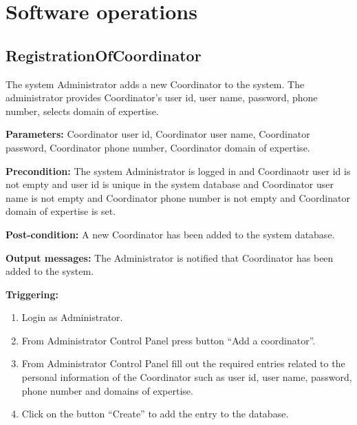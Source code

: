 \chapter{Software operations}
\label{chap:soptware_operations}

\section{RegistrationOfCoordinator}
\label{operation:RegistrationOfCoordinator}
The system Administrator adds a new Coordinator to the system. The administrator 
provides Coordinator's user id, user name, password, phone number, selects
domain of expertise.

\begin{description}

\item \textbf{Parameters:} Coordinator user id, Coordinator user name,
Coordinator password, Coordinator phone number, Coordinator domain of expertise.
\item \textbf{Precondition:} The system Administrator is logged in and
Coordinaotr user id is not empty and user id is unique in the system database
and Coordinator user name is not empty and Coordinator phone number is not empty and Coordinator domain of expertise is
set.
\item \textbf{Post-condition:} A new Coordinator has been added to the system
database.
\item \textbf{Output messages:} The Administrator is notified that Coordinator
has been added to the system.

\item \textbf{Triggering:}
\begin{enumerate}
\item Login as Administrator.
\item From Administrator Control Panel press button ``Add a coordinator''.
\item From Administrator Control Panel fill out the required entries related to
the personal information of the Coordinator such as user id, user name,
password, phone number and domains of expertise.
\item Click on the button ``Create'' to add the entry to the database.
\end{enumerate}
 
\end{description}


